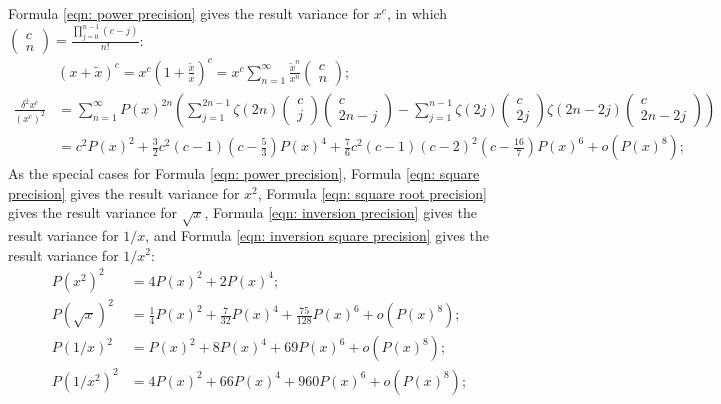 \documentclass[twoside]{article}
\numberwithin{equation}{section}
\begin{document}
Formula \eqref{eqn: power precision} gives the result variance for $x^c$, in which $\begin{pmatrix} c \\ n \end{pmatrix} = \frac{\prod_{j=0}^{n-1} (c -j)}{n!}$:
\begin{align}
\label{eqn: power Taylor}
&(x + \tilde{x})^c = x^c (1 + \frac{\tilde{x}}{x})^c = x^c \sum_{n=1}^{\infty} \frac{\tilde{x}^n}{x^n} \begin{pmatrix} c \\ n \end{pmatrix}; \\
\label{eqn: power precision}
\frac{\delta^2 x^c}{(x^c)^2} &= \sum_{n=1}^{\infty} P(x)^{2n} 
 \left( \sum_{j=1}^{2n-1} \zeta(2n) \begin{pmatrix} c \\ j \end{pmatrix} \begin{pmatrix} c \\ 2n - j \end{pmatrix}
 - \sum_{j=1}^{n-1} \zeta(2j) \begin{pmatrix} c \\ 2j \end{pmatrix} \zeta(2n - 2j) \begin{pmatrix} c \\ 2n -2 j \end{pmatrix}  \right)\\
 &= c^2 P(x)^2 + \frac{3}{2} c^2 (c-1) (c - \frac{5}{3}) P(x)^4 + \frac{7}{6} c^2 (c-1) (c-2)^2 (c - \frac{16}{7}) P(x)^6 + o(P(x)^8);
\end{align}
As the special cases for Formula \eqref{eqn: power precision}, Formula \eqref{eqn: square precision} gives the result variance for $x^2$, Formula \eqref{eqn: square root precision} gives the result variance for $\sqrt{x}$, Formula \eqref{eqn: inversion precision} gives the result variance for $1/x$, and Formula \eqref{eqn: inversion square precision} gives the result variance for $1/x^2$: 
\begin{align}
\label{eqn: square precision}
P(x^2)^2 &= 4 P(x)^2 + 2 P(x)^4; \\
\label{eqn: square root precision}
P(\sqrt{x})^2 &= \frac{1}{4} P(x)^2 + \frac{7}{32} P(x)^4 + \frac{75}{128} P(x)^6 + o(P(x)^8); \\
\label{eqn: inversion precision}
P(1/x)^2 &= P(x)^2 + 8 P(x)^4 + 69 P(x)^6 + o(P(x)^8); \\
\label{eqn: inversion square precision}
P(1/x^2)^2 &= 4 P(x)^2 + 66 P(x)^4 + 960 P(x)^6 + o(P(x)^8);
\end{align}
\end{document}
